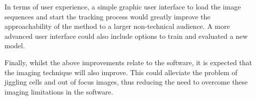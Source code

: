 In terms of user experience, a simple graphic user interface to load the image sequences and start the tracking process would greatly improve the approachability of the method to a larger non-technical audience. A more advanced user interface could also include options to train and evaluated a new model.

Finally, whilst the above improvements relate to the software, it is expected that the imaging technique will also improve. This could alleviate the problem of jiggling cells and out of focus images, thus reducing the need to overcome these imaging limitations in the software.